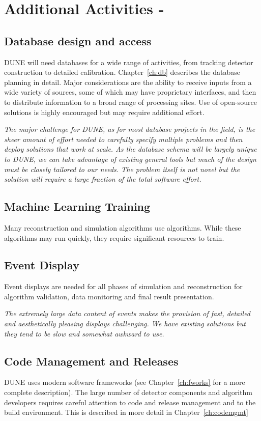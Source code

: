 \documentclass[../main-v1.tex]{subfiles}
\begin{document}
\section{Additional Activities - }

\subsection{Database design and access}
DUNE will need databases for a wide range of activities, from tracking detector construction to detailed calibration.  Chapter~\ref{ch:db} describes the database planning in detail.  Major considerations are the ability to  receive inputs from a wide variety of sources, some of which may have proprietary interfaces, and then to distribute information to a broad range of processing sites.   Use of open-source solutions is highly encouraged but may require additional effort.

{\it The major challenge for DUNE, as for most database projects in the field, is the sheer amount of effort needed to carefully specify multiple problems and then deploy solutions that work at scale. As the database schema will be largely unique to DUNE, we can take advantage of existing general tools but much of the design must be closely tailored to our needs. The problem itself is not novel but the solution will require a large fraction of the total software effort.}


\subsection{Machine Learning Training} 
Many reconstruction and simulation algorithms use  algorithms.  While these algorithms may run quickly, they   require significant resources to train.  

\subsection{Event Display}
Event displays are needed for all phases of simulation and reconstruction for algorithm validation, data monitoring and final result presentation. 

{\it The extremely large data content of  events makes the provision of fast, detailed and aesthetically pleasing displays challenging.  We have existing solutions but they tend to be slow and somewhat awkward to use.}

\subsection{Code Management and Releases}
DUNE  uses modern software frameworks (see Chapter~\ref{ch:fworks} for a more complete description). The large number of detector components and algorithm developers requires careful attention to code and release management and to the build environment.  This is described in more detail in Chapter~\ref{ch:codemgmt}
\end{document}
